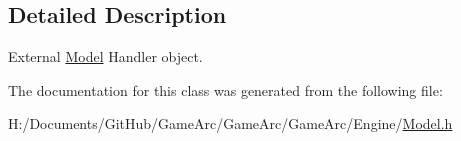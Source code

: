 \subsection{Detailed Description}
External \hyperlink{class_model}{Model} Handler object. 

The documentation for this class was generated from the following file\+:\begin{DoxyCompactItemize}
\item 
H\+:/\+Documents/\+Git\+Hub/\+Game\+Arc/\+Game\+Arc/\+Game\+Arc/\+Engine/\hyperlink{_model_8h}{Model.\+h}\end{DoxyCompactItemize}

